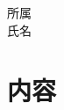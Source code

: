 \documentclass[dvipdfmx,uplatex,a4paper,12pt]{article}
\begin{document}
\begin{center}
  \underline{\hspace{1cm}\hspace{1cm}}
\end{center}

\vspace{1cm}

\begin{flushright}
  所属 \\
  氏名
\end{flushright}

\section*{内容}
\end{document}
